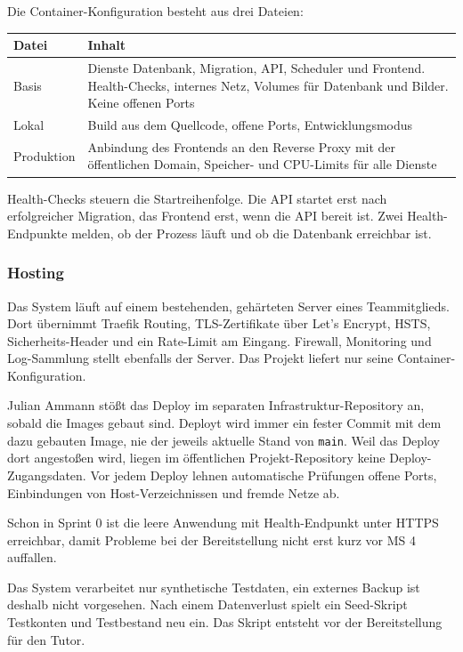 \documentclass[11pt,a4paper]{article}
\begin{document}
Die Container-Konfiguration besteht aus drei Dateien:

\begin{tabularx}{\linewidth}{@{}l >{\hsize=1.00\hsize\RaggedRight\arraybackslash}X@{}}
\toprule
\textbf{Datei} & \textbf{Inhalt} \\
\midrule
\endhead
Basis & Dienste Datenbank, Migration, API, Scheduler und Frontend. Health-Checks, internes Netz, Volumes für Datenbank und Bilder. Keine offenen Ports \\
Lokal & Build aus dem Quellcode, offene Ports, Entwicklungsmodus \\
Produktion & Anbindung des Frontends an den Reverse Proxy mit der öffentlichen Domain, Speicher- und CPU-Limits für alle Dienste \\
\bottomrule
\end{tabularx}

Health-Checks steuern die Startreihenfolge. Die API startet erst nach erfolgreicher Migration, das Frontend erst, wenn die API bereit ist. Zwei Health-Endpunkte melden, ob der Prozess läuft und ob die Datenbank erreichbar ist.

\subsubsection{Hosting}

Das System läuft auf einem bestehenden, gehärteten Server eines Teammitglieds. Dort übernimmt Traefik Routing, TLS-Zertifikate über Let's Encrypt, HSTS, Sicherheits-Header und ein Rate-Limit am Eingang. Firewall, Monitoring und Log-Sammlung stellt ebenfalls der Server. Das Projekt liefert nur seine Container-Konfiguration.

Julian Ammann stößt das Deploy im separaten Infrastruktur-Repository an, sobald die Images gebaut sind. Deployt wird immer ein fester Commit mit dem dazu gebauten Image, nie der jeweils aktuelle Stand von \texttt{main}. Weil das Deploy dort angestoßen wird, liegen im öffentlichen Projekt-Repository keine Deploy-Zugangsdaten. Vor jedem Deploy lehnen automatische Prüfungen offene Ports, Einbindungen von Host-Verzeichnissen und fremde Netze ab.

Schon in Sprint 0 ist die leere Anwendung mit Health-Endpunkt unter HTTPS erreichbar, damit Probleme bei der Bereitstellung nicht erst kurz vor MS 4 auffallen.

Das System verarbeitet nur synthetische Testdaten, ein externes Backup ist deshalb nicht vorgesehen. Nach einem Datenverlust spielt ein Seed-Skript Testkonten und Testbestand neu ein. Das Skript entsteht vor der Bereitstellung für den Tutor.
\end{document}
